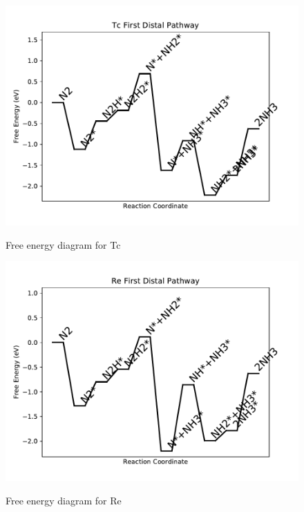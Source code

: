 \documentclass[journal=jacsat,manuscript=article]{achemso}
\begin{document}
\begin{figure}
\includegraphics[width=1\linewidth]{data/plots/Tc_distal_1.pdf}
\label{fig:Tc_distal_1}
\caption{Free energy diagram for Tc}
\end{figure}

\newpage
\begin{figure}
\includegraphics[width=1\linewidth]{data/plots/Re_distal_1.pdf}
\label{fig:Re_distal_1}
\caption{Free energy diagram for Re}
\end{figure}
\end{document}
